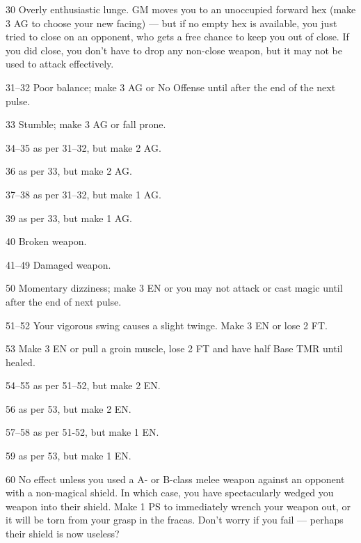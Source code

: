 \begin{multicols*}{3}
\begin{Description}
\item[30] Overly enthusiastic lunge. GM moves you to an unoccupied
forward hex (make 3 \x AG to choose your new facing) --- but if no
empty hex is available, you just tried to close on an opponent, who
gets a free chance to keep you out of close. If you did close, you
don't have to drop any non-close weapon, but it may not be used to
attack effectively.

\item[31--32] Poor balance; make 3 \x AG or No Offense until after the end
of the next pulse.

\item[33] Stumble; make 3 \x AG or fall prone.

\item[34--35] as per 31--32, but make 2 \x AG.

\item[36] as per 33, but make 2 \x AG.

\item[37--38] as per 31--32, but make 1 \x AG.

\item[39] as per 33, but make 1 \x AG.

\item[40] Broken weapon.

\item[41--49] Damaged weapon.

\item[50] Momentary dizziness; make 3 \x EN or you may not attack or
cast magic until after the end of next pulse.

\item[51--52] Your vigorous swing causes a slight twinge. Make 3 \x EN or lose 2 FT.

\item[53] Make 3 \x EN or pull a groin muscle, lose 2 FT and have half Base TMR until healed.

\item[54--55] as per 51--52, but make 2 \x EN.

\item[56] as per 53, but make 2 \x EN.

\item[57--58] as per 51-52, but make 1 \x EN.

\item[59] as per 53, but make 1 \x EN.

\item[60] No effect unless you used a A- or B-class melee weapon
against an opponent with a non-magical shield. In which case, you have
spectacularly wedged you weapon into their shield. Make 1 \x PS to
immediately wrench your weapon out, or it will be torn from your grasp
in the fracas. Don't worry if you fail --- perhaps their shield is now
useless?


\end{Description}
\end{multicols*}
